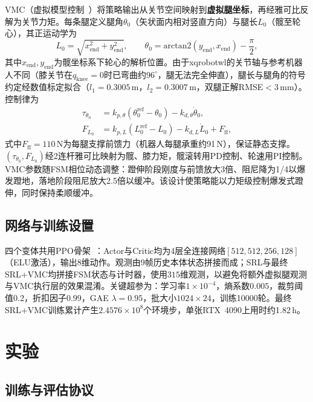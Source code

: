 \documentclass[12pt,a4paper,fontset=fandol]{ctexart}
\numberwithin{equation}{section}
\numberwithin{figure}{section}
\numberwithin{table}{section}
\begin{document}
VMC（虚拟模型控制~\cite{pratt2001vmc}）将策略输出从关节空间映射到\textbf{虚拟腿坐标}，再经雅可比反解为关节力矩。每条腿定义腿角$\theta_0$（矢状面内相对竖直方向）与腿长$L_0$（髋至轮心），其正运动学为
\begin{equation}
L_0 = \sqrt{x_{\text{end}}^2 + y_{\text{end}}^2},\qquad
\theta_0 = \mathrm{arctan2}(y_{\text{end}}, x_{\text{end}}) - \frac{\pi}{2},
\label{eq:fk}
\end{equation}
其中$x_{\text{end}}, y_{\text{end}}$为髋坐标系下轮心的解析位置。由于xqrobotwl的关节轴与参考机器人不同（膝关节在$q_{\text{knee}}=0$时已弯曲约$96^\circ$，腿无法完全伸直），腿长与腿角的符号约定经数值标定拟合（$l_1=0.3005$\,m，$l_2=0.3007$\,m，双腿正解RMSE$<3$\,mm）。控制律为
\begin{align}
\tau_{\theta_0} &= k_{p,\theta}(\theta_0^{\text{ref}}-\theta_0) - k_{d,\theta}\dot\theta_0,\\
F_{L_0} &= k_{p,L}(L_0^{\text{ref}}-L_0) - k_{d,L}\dot L_0 + F_{\text{ff}},
\label{eq:vmc_law}
\end{align}
式中$F_{\text{ff}}=110$\,N为每腿支撑前馈力（机器人每腿承重约91\,N），保证静态支撑。$(\tau_{\theta_0}, F_{L_0})$经2连杆雅可比映射为髋、膝力矩，髋滚转用PD控制、轮速用PI控制。VMC参数随FSM相位动态调整：蹬伸阶段刚度与前馈放大3倍、阻尼降为1/4以爆发蹬地，落地阶段阻尼放大2.5倍以缓冲。该设计使策略能以力矩级控制爆发式蹬伸，同时保持柔顺缓冲。

\subsection{网络与训练设置}

四个变体共用PPO骨架~\cite{schulman2017ppo}：Actor与Critic均为4层全连接网络$[512,512,256,128]$（ELU激活），输出8维动作。观测由9帧历史本体状态拼接而成；SRL与最终SRL+VMC均拼接FSM状态与计时器，使用$315$维观测，以避免将额外虚拟腿观测与VMC执行层的效果混淆。关键超参为：学习率$1\times10^{-4}$，熵系数$0.005$，裁剪阈值$0.2$，折扣因子$0.99$，GAE $\lambda=0.95$，批大小$1024\times24$，训练10000轮。最终SRL+VMC训练累计产生$2.4576\times10^8$个环境步，单张RTX~4090上用时约1.82\,h。

\section{实验}

\subsection{训练与评估协议}
\end{document}
